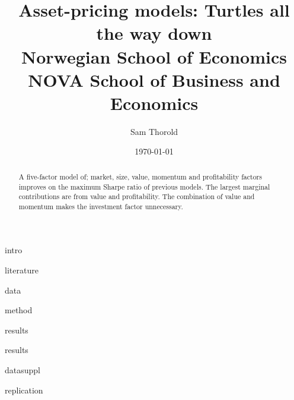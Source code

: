 \documentclass[a4paper, 12pt]{article}
\title{
  {Asset-pricing models: Turtles all the way down}\\
  {\large Norwegian School of Economics}\\
  {\large NOVA School of Business and Economics}
}
\author{Sam Thorold}
\date{\today}
\begin{document}
\maketitle

\begin{abstract}
  A five-factor model of; market, size,  value, momentum and profitability 
  factors improves on the maximum Sharpe ratio of previous models. The largest 
  marginal contributions are from value and profitability. The combination of 
  value and momentum makes the investment factor unnecessary.
\end{abstract}

{intro}

{literature}

{data}

{method}

{results}

{results}

\printbibliography

\appendix

{datasuppl}

{replication}
\end{document}
